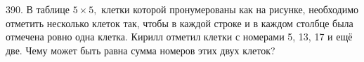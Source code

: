 390. В таблице $5\times5,$ клетки которой пронумерованы как на рисунке, необходимо отметить несколько клеток так, чтобы в каждой строке и в каждом столбце была отмечена ровно одна клетка. Кирилл отметил клетки с номерами 5, 13, 17 и ещё две. Чему может быть равна сумма номеров этих двух клеток?\\
\begin{figure}[ht!]
\end{figure}\\
